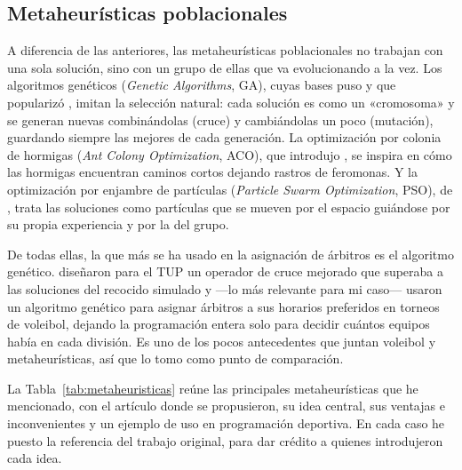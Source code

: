\documentclass[11pt,a4paper,spanish]{book}
\numberwithin{equation}{chapter}
\numberwithin{figure}{chapter}
\numberwithin{table}{chapter}
\begin{document}
\subsection{Metaheurísticas poblacionales}

A diferencia de las anteriores, las metaheurísticas poblacionales no trabajan con una sola solución, sino con un grupo de ellas que va evolucionando a la vez. Los algoritmos genéticos (\emph{Genetic Algorithms}, GA), cuyas bases puso  y que popularizó , imitan la selección natural: cada solución es como un «cromosoma» y se generan nuevas combinándolas (cruce) y cambiándolas un poco (mutación), guardando siempre las mejores de cada generación. La optimización por colonia de hormigas (\emph{Ant Colony Optimization}, ACO), que introdujo , se inspira en cómo las hormigas encuentran caminos cortos dejando rastros de feromonas. Y la optimización por enjambre de partículas (\emph{Particle Swarm Optimization}, PSO), de , trata las soluciones como partículas que se mueven por el espacio guiándose por su propia experiencia y por la del grupo.

De todas ellas, la que más se ha usado en la asignación de árbitros es el algoritmo genético.  diseñaron para el TUP un operador de cruce mejorado que superaba a las soluciones del recocido simulado y —lo más relevante para mi caso—  usaron un algoritmo genético para asignar árbitros a sus horarios preferidos en torneos de voleibol, dejando la programación entera solo para decidir cuántos equipos había en cada división. Es uno de los pocos antecedentes que juntan voleibol y metaheurísticas, así que lo tomo como punto de comparación.

La Tabla~\ref{tab:metaheuristicas} reúne las principales metaheurísticas que he mencionado, con el artículo donde se propusieron, su idea central, sus ventajas e inconvenientes y un ejemplo de uso en programación deportiva. En cada caso he puesto la referencia del trabajo original, para dar crédito a quienes introdujeron cada idea.
\end{document}
